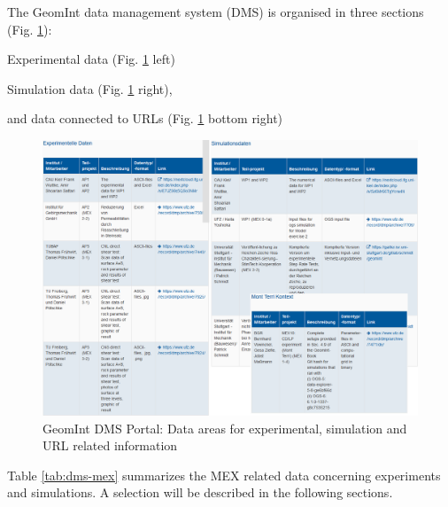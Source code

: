 The GeomInt data management system (DMS) is organised in three sections (Fig. \ref{fig:geomint-dms-ove}):
\begin{list}{-}{\leftmargin=1em \itemindent=0em \itemsep=0em}
\item Experimental data (Fig. \ref{fig:geomint-dms-ove} left)
\item Simulation data (Fig. \ref{fig:geomint-dms-ove} right),
\item and data connected to URLs (Fig. \ref{fig:geomint-dms-ove} bottom right)
\end{list}

\begin{figure}[!ht]
\includegraphics[width=\textwidth]{figures/geomint-dms-ove.png}
\caption{GeomInt DMS Portal: Data areas for experimental, simulation and URL related information}
\label{fig:geomint-dms-ove}
\end{figure}

Table \ref{tab:dms-mex} summarizes the MEX related data concerning experiments and simulations.
A selection will be described in the following sections.

